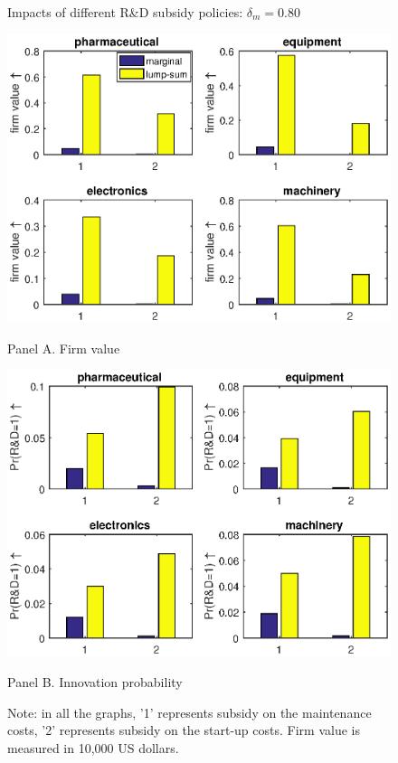 \documentclass[11pt]{article}
\begin{document}
\begin{figure}[h]
    \caption{Impacts of different R\&D subsidy policies: $\delta_m=0.80$}
    \label{F6}
     \centering
    \begin{minipage}{0.48\textwidth}
        \includegraphics[width=\textwidth]{Figs/FirmvalueChange.eps}   
        \caption*{Panel A. Firm value}   
    \end{minipage}
     \hfill
     \begin{minipage}{0.48\textwidth}
         \includegraphics[width=\textwidth]{Figs/ProbChange.eps}
         \caption*{Panel B. Innovation probability}
     \end{minipage}
    \caption*{\small{}Note: in all the graphs, '1' represents subsidy on the maintenance costs, '2' represents subsidy on the start-up costs. Firm value is measured in 10,000 US dollars.}{\small \par}
\end{figure}
\end{document}
